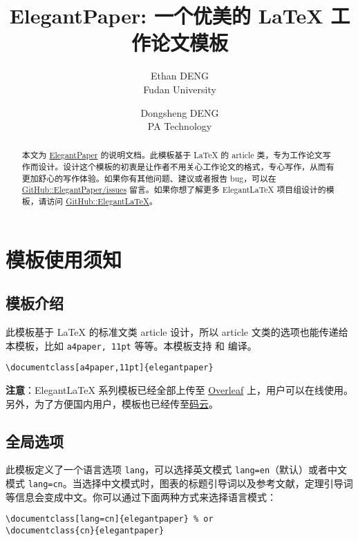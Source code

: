\documentclass[lang=cn,11pt,a4paper,cite=authoryear]{elegantpaper}
\title{ElegantPaper: 一个优美的 \LaTeX{} 工作论文模板}
\author{Ethan DENG \\ Fudan University \and Dongsheng DENG \\ PA Technology}
\institute{\href{https://elegantlatex.org/}{Elegant\LaTeX{} 项目组}}
\date{\zhtoday}
\begin{document}
\maketitle

\begin{abstract}
本文为 \href{https://github.com/ElegantLaTeX/ElegantPaper/}{ElegantPaper} 的说明文档。此模板基于 \LaTeX{} 的 article 类，专为工作论文写作而设计。设计这个模板的初衷是让作者不用关心工作论文的格式，专心写作，从而有更加舒心的写作体验。如果你有其他问题、建议或者报告 bug，可以在 \href{https://github.com/ElegantLaTeX/ElegantPaper/issues}{GitHub::ElegantPaper/issues} 留言。如果你想了解更多 Elegant\LaTeX{} 项目组设计的模板，请访问 \href{https://github.com/ElegantLaTeX/}{GitHub::ElegantLaTeX}。
\end{abstract}



\section{模板使用须知}

\subsection{模板介绍}

此模板基于 \LaTeX{} 的标准文类 article 设计，所以 article 文类的选项也能传递给本模板，比如 \lstinline{a4paper, 11pt} 等等。本模板支持  和  编译。

\begin{lstlisting}
\documentclass[a4paper,11pt]{elegantpaper}
\end{lstlisting}

\textbf{注意}：Elegant\LaTeX{} 系列模板已经全部上传至 \href{https://www.overleaf.com/latex/templates/elegantpaper-template/yzghrqjhmmmr}{Overleaf} 上，用户可以在线使用。另外，为了方便国内用户，模板也已经传至\href{https://gitee.com/ElegantLaTeX/ElegantPaper}{码云}。


\subsection{全局选项}
此模板定义了一个语言选项 \lstinline{lang}，可以选择英文模式 \lstinline{lang=en}（默认）或者中文模式 \lstinline{lang=cn}。当选择中文模式时，图表的标题引导词以及参考文献，定理引导词等信息会变成中文。你可以通过下面两种方式来选择语言模式：
\begin{lstlisting}
\documentclass[lang=cn]{elegantpaper} % or
\documentclass{cn}{elegantpaper} 
\end{lstlisting}
\end{document}
